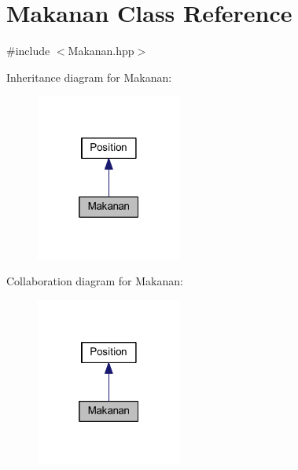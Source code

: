 \hypertarget{class_makanan}{}\section{Makanan Class Reference}
\label{class_makanan}


{\ttfamily \#include $<$Makanan.\+hpp$>$}



Inheritance diagram for Makanan\+:\nopagebreak
\begin{figure}[H]
\begin{center}
\leavevmode
\includegraphics[width=136pt]{class_makanan__inherit__graph}
\end{center}
\end{figure}


Collaboration diagram for Makanan\+:\nopagebreak
\begin{figure}[H]
\begin{center}
\leavevmode
\includegraphics[width=136pt]{class_makanan__coll__graph}
\end{center}
\end{figure}
